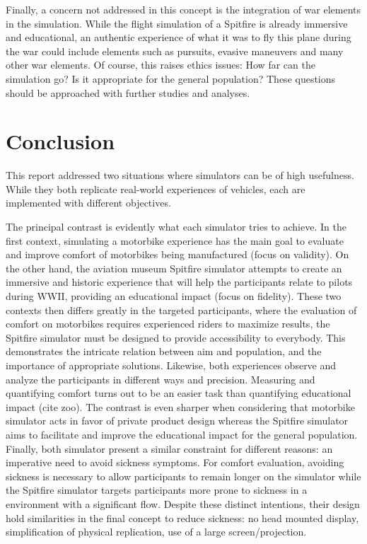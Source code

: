 \documentclass[authoryear,preprint]{sigplanconf}
\begin{document}
Finally, a concern not addressed in this concept is the integration of war elements in the simulation. While the flight simulation of a Spitfire is already immersive and educational, an authentic experience of what it was to fly this plane during the war could include elements such as pursuits, evasive maneuvers and many other war elements. Of course, this raises ethics issues: How far can the simulation go? Is it appropriate for the general population? These questions should be approached with further studies and analyses.

\section{Conclusion}

This report addressed two situations where simulators can be of high usefulness. While they both replicate real-world experiences of vehicles, each are implemented with different objectives.

The principal contrast is evidently what each simulator tries to achieve. In the first context, simulating a motorbike experience has the main goal to evaluate and improve comfort of motorbikes being manufactured (focus on validity). On the other hand, the aviation museum Spitfire simulator attempts to create an immersive and historic experience that will help the participants relate to pilots during WWII, providing an educational impact (focus on fidelity). These two contexts then differs greatly in the targeted participants, where the evaluation of comfort on motorbikes requires experienced riders to maximize results, the Spitfire simulator must be designed to provide accessibility to everybody. This demonstrates the intricate relation between aim and population, and the importance of appropriate solutions. Likewise, both experiences observe and analyze the participants in different ways and precision. Measuring and quantifying comfort turns out to be an easier task than quantifying educational impact (cite zoo). The contrast is even sharper when considering that motorbike simulator acts in favor of private product design whereas the Spitfire simulator aims to facilitate and improve the educational impact for the general population. Finally, both simulator present a similar constraint for different reasons: an imperative need to avoid sickness symptoms. For comfort evaluation, avoiding sickness is necessary to allow participants to remain longer on the simulator while the Spitfire simulator targets participants more prone to sickness in a environment with a significant flow. Despite these distinct intentions, their design hold similarities in the final concept to reduce sickness: no head mounted display, simplification of physical replication, use of a large screen/projection.






\end{document}
